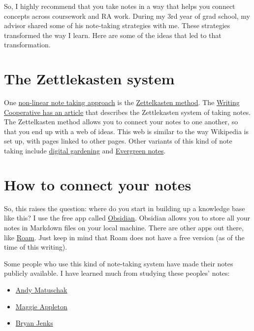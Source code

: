 \documentclass[
]{book}
\begin{document}
So, I highly recommend that you take notes in a way that helps you connect concepts across coursework and RA work. During my 3rd year of grad school, my advisor shared some of his note-taking strategies with me. These strategies transformed the way I learn. Here are some of the ideas that led to that transformation.

\hypertarget{zettelkasten}{%
\section{The Zettlekasten system}\label{zettelkasten}}

One \href{https://en.wikipedia.org/wiki/Note-taking\#Non-linear_note-taking}{non-linear note taking approach} is the \href{https://zettelkasten.de/posts/overview/}{Zettelkasten method}. The \href{https://writingcooperative.com/zettelkasten-how-one-german-scholar-was-so-freakishly-productive-997e4e0ca125}{Writing Cooperative has an article} that describes the Zettlekasten system of taking notes. The Zettelkasten method allows you to connect your notes to one another, so that you end up with a web of ideas. This web is similar to the way Wikipedia is set up, with pages linked to other pages. Other variants of this kind of note taking include \href{https://maggieappleton.com/garden-history}{digital gardening} and \href{https://notes.andymatuschak.org/Evergreen_note-writing_as_fundamental_unit_of_knowledge_work?stackedNotes=z4SDCZQeRo4xFEQ8H4qrSqd68ucpgE6LU155C}{Evergreen notes}.

\hypertarget{how-to-connect-your-notes}{%
\section{How to connect your notes}\label{how-to-connect-your-notes}}

So, this raises the question: where do you start in building up a knowledge base like this? I use the free app called \href{https://obsidian.md/}{Obsidian}. Obsidian allows you to store all your notes in Markdown files on your local machine. There are other apps out there, like \href{https://roamresearch.com/}{Roam}. Just keep in mind that Roam does not have a free version (as of the time of this writing).

Some people who use this kind of note-taking system have made their notes publicly available. I have learned much from studying these peoples' notes:

\begin{itemize}
\item
  \href{https://notes.andymatuschak.org/About_these_notes}{Andy Matuschak}
\item
  \href{https://maggieappleton.com/notes}{Maggie Appleton}
\item
  \href{https://publish.obsidian.md/bryan-jenks/Z/INDEX}{Bryan Jenks}
\end{itemize}
\end{document}
